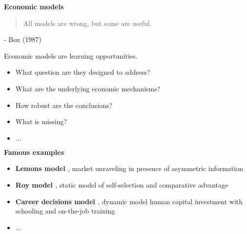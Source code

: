 \begin{frame}\begin{center}
		\LARGE\textbf{Economic models}
\end{center}\end{frame}
\begin{frame}\begin{quote}
All models are wrong, but some are useful.
\end{quote}\vspace{-0.5pt} \hspace{6cm} - Box (1987)
\end{frame}
\begin{frame}
Economic models are learning opportunities.\vspace{0.3cm}
\begin{itemize}\setlength\itemsep{1em}
\item What question are they designed to address?
\item What are the underlying economic mechanisms?
\item How robust are the conclusions?
\item What is missing?
\item $\hdots$
\end{itemize}

\end{frame}
\begin{frame}\textbf{Famous examples}\vspace{0.3cm}

\begin{itemize}\setlength\itemsep{1em}
\item \textbf{Lemons model \cite{Akerlof.1970}}, market unraveling in presence of asymmetric information
\item \textbf{Roy model \cite{Roy.1951}}, static model of self-selection and comparative advantage
\item \textbf{Career decisions model \cite{Keane.1997}}, dynamic model human capital investment with schooling and on-the-job training
\item $\hdots$
\end{itemize}

\end{frame}
